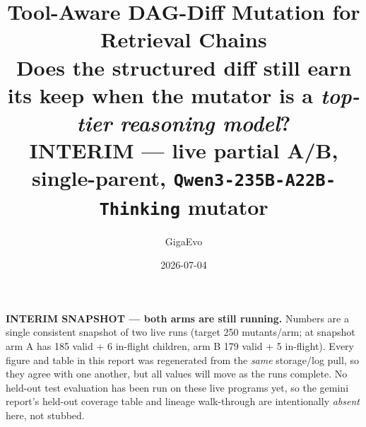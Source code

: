 \documentclass[11pt]{article}
\title{\color{accent}\bfseries Tool-Aware DAG-Diff Mutation for Retrieval Chains\\
\large Does the structured diff still earn its keep when the mutator is a
\emph{top-tier reasoning model}?\\
\large \textcolor{warn}{\bfseries INTERIM} --- live partial A/B, single-parent,
\texttt{Qwen3-235B-A22B-Thinking} mutator}
\author{GigaEvo}
\date{2026-07-04}
\newcommand{\armA}{\textcolor{bad}{arm A}}
\newcommand{\armB}{\textcolor{accent}{arm B}}
\newenvironment{interimbox}
  {\par\medskip\noindent\begin{lrbox}{\eliBox}\begin{minipage}{\dimexpr\linewidth-2\fboxsep-2\fboxrule}\small}
  {\end{minipage}\end{lrbox}\noindent\fcolorbox{warn!60}{warn!8}{\usebox{\eliBox}}\par\medskip}
\begin{document}
\maketitle

\begin{interimbox}
\textbf{\textcolor{warn}{INTERIM SNAPSHOT --- both arms are still running.}} Numbers
are a single consistent snapshot of two live runs (target 250 mutants/arm; at snapshot
\armA{} has 185 valid + 6 in-flight children, \armB{} 179 valid + 5 in-flight). Every
figure and table in this report was regenerated from the \emph{same} storage/log pull, so
they agree with one another, but all values will move as the runs complete. No held-out
test evaluation has been run on these live programs yet, so the gemini report's held-out
coverage table and lineage walk-through are intentionally \emph{absent} here, not stubbed.
\end{interimbox}
\end{document}

